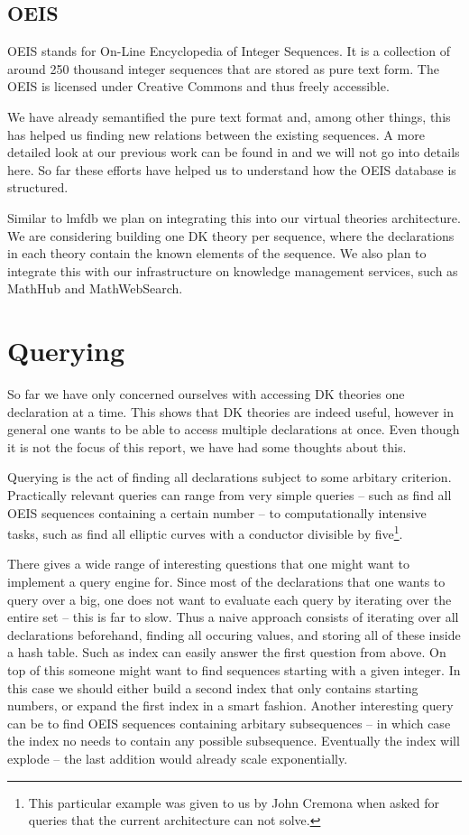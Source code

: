 \documentclass{deliverablereport}
\begin{document}
\subsection{OEIS}

OEIS \cite{oeis} stands for On-Line Encyclopedia of Integer Sequences. It is a collection of around 250 thousand integer sequences that are stored as pure text form. The OEIS is licensed under Creative Commons and thus freely accessible.

We have already semantified the pure text format and, among other things, this has helped us finding new relations between the existing sequences. A more detailed look at our previous work can be found in \cite{LuzKoh:fsarfo16} and we will not go into details here. So far these efforts have helped us to understand how the OEIS database is structured.

Similar to lmfdb we plan on integrating this into our virtual theories architecture. We are considering building one DK theory per sequence, where the declarations in each theory contain the known elements of the sequence. We also plan to integrate this with our infrastructure on knowledge management services, such as MathHub and MathWebSearch.

\section{Querying}

So far we have only concerned ourselves with accessing DK theories one declaration at a time. This shows that DK theories are indeed useful, however in general one wants to be able to access multiple declarations at once. Even though it is not the focus of this report, we have had some thoughts about this.

Querying is the act of finding all declarations subject to some arbitary criterion. Practically relevant queries can range from very simple queries -- such as find all OEIS sequences containing a certain number -- to computationally intensive tasks, such as find all elliptic curves with a conductor divisible by five\footnote{This particular example was given to us by John Cremona when asked for queries that the current architecture can not solve. }.

There gives a wide range of interesting questions that one might want to implement a query engine for. Since most of the declarations that one wants to query over a big, one does not want to evaluate each query by iterating over the entire set -- this is far to slow. Thus a naive approach consists of iterating over all declarations beforehand, finding all occuring values, and storing all of these inside a hash table. Such as index can easily answer the first question from above. On top of this someone might want to find sequences starting with a given integer. In this case we should either build a second index that only contains starting numbers, or expand the first index in a smart fashion. Another interesting query can be to find OEIS sequences containing arbitary subsequences -- in which case the index no needs to contain any possible subsequence. Eventually the index will explode -- the last addition would already scale exponentially.
\end{document}
